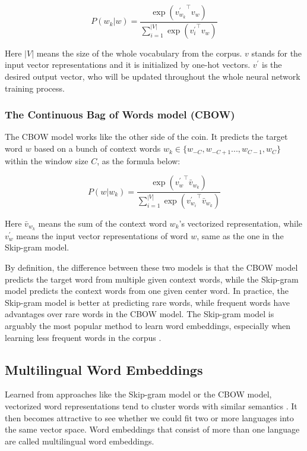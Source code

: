 \documentclass[thesis,fonts=libertine]{cluu}
\begin{document}
\begin{equation*}
  P(w_k|w)=\frac{\exp({v_{w_k}^\prime}^\intercal v_w)}{\sum_{i=1}^{|V|}\exp({v^\prime_i}^\intercal v_w)}
\end{equation*}

\noindent Here $|V|$ means the size of the whole vocabulary from the corpus. $v$ stands for the input vector representations and it is initialized by one-hot vectors. $v^\prime$ is the desired output vector, who will be updated throughout the whole neural network training process. 

\subsubsection{The Continuous Bag of Words model (CBOW)}
The CBOW model works like the other side of the coin. It predicts the target word $w$ based on a bunch of context words $w_k \in \{w_{-C}, w_{-C+1} ..., w_{C-1}, w_C\}$ within the window size $C$, as the formula below:

\begin{equation*}
  P(w|w_k)=\frac{\exp({v^\prime_w}^\intercal \bar{v}_{w_k})}{\sum^{|V|}_{i=1}\exp({v^\prime_{w_i}}^\intercal \bar{v}_{w_k})}
\end{equation*}

\noindent Here $\bar{v}_{w_k}$ means the sum of the context word $w_k$'s vectorized representation, while $v^\prime_w$ means the input vector representations of word $w$, same as the one in the Skip-gram model.

By definition, the difference between these two models is that the CBOW model predicts the target word from multiple given context words, while the Skip-gram model predicts the context words from one given center word. In practice, the Skip-gram model is better at predicting rare words, while frequent words have advantages over rare words in the CBOW model. The Skip-gram model is arguably the most popular method to learn word embeddings, especially when learning less frequent words in the corpus \parencite{levy-etal-2015-improving}.

\subsection{Multilingual Word Embeddings}
\label{sec:multilingual_word_embeddings}

Learned from approaches like the Skip-gram model or the CBOW model, vectorized word representations tend to cluster words with similar semantics \parencite{Mikolov:2013ac}. It then becomes attractive to see whether we could fit two or more languages into the same vector space. Word embeddings that consist of more than one language are called multilingual word embeddings.
\end{document}
